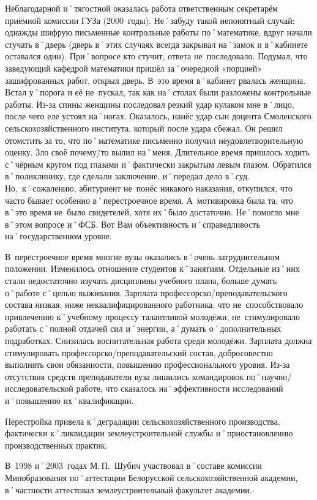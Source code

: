 Неблагодарной и˚тягостной оказалась работа ответственным секретарём приёмной комиссии ГУЗа (2000~годы). Не˚забуду такой непонятный случай: однажды шифрую письменные контрольные работы по˚математике, вдруг начали стучать в˚дверь (дверь в˚этих случаях всегда закрывал на˚замок и в˚кабинете оставался один). При˚вопросе кто стучит, ответа не~последовало. Подумал, что заведующий кафедрой математики пришёл за˚очередной «порцией» зашифрованных работ, открыл дверь. В~это время в˚кабинет рвалась женщина. Встал у˚порога и её не~пускал, так как на˚столах были разложены контрольные работы. Из-за спины женщины последовал резкий удар кулаком мне в˚лицо, после чего еле устоял на˚ногах. Оказалось, нанёс удар сын доцента Смоленского сельскохозяйственного института, который после удара сбежал. Он решил отомстить за то, что по˚математике письменно получил неудовлетворительную оценку. Зло своё почему\=/то вылил на˚меня. Длительное время пришлось ходить с˚чёрным кругом под глазами и˚фактически закрытым левым глазом. Обратился в˚поликлинику, где сделали заключение, и˚передал дело в˚суд. Но,~к˚сожалению, абитуриент не~понёс никакого наказания, откупился, что часто бывает особенно в˚перестроечное время. А~мотивировка была та, что в˚это время не~было свидетелей, хотя их˚было достаточно. Не˚помогло мне в˚этом вопросе и˚ФСБ. Вот Вам объективность и˚справедливость на˚государственном уровне.

В~перестроечное время многие вузы оказались в˚очень затруднительном положении. Изменилось отношение студентов к˚занятиям. Отдельные из˚них стали недостаточно изучать дисциплины учебного плана, больше думать о˚работе с˚целью выживания. Зарплата профессорско\-/преподавательского состава низкая, ниже неквалифицированного работника, что не~способствовало привлечению к˚учебному процессу талантливой молодёжи, не~стимулировало работать с˚полной отдачей сил и˚энергии, а˚думать о˚дополнительных подработках. Снизилась воспитательная работа среди молодёжи. Зарплата должна стимулировать профессорско\-/преподавательский состав, добросовестно выполнять свои обязанности, повышению профессионального уровня. Из-за отсутствия средств преподаватели вуза лишились командировок по˚научно\-/исследовательской работе, что сказалось на˚эффективности исследований и˚повышению их˚квалификации. 

Перестройка привела к˚деградации сельскохозяйственного производства, фактически к˚ликвидации землеустроительной службы и˚приостановлению производственных практик. 

В~1998 и˚2003~годах М.\,П.~Шубич участвовал в˚составе комиссии Минобразования по˚аттестации Белорусской сельскохозяйственной академии, в˚частности аттестовал землеустроительный факультет академии. 

